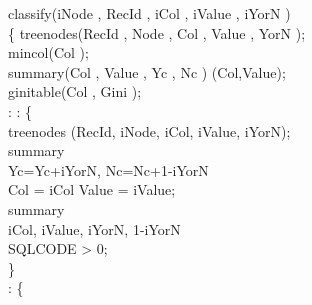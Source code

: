 {\renewcommand{\baselinestretch}{1}
\normalsize

\begin{algorithm}[!htb]
\begin{algorithmic}[1]
\STATE{} classify(iNode , RecId , iCol , \kw{}iValue , iYorN )\\
\STATE\{\hspace{.2cm} treenodes(RecId , Node , Col , \kw{}Value , YorN );\\
\STATE\hspace{.3cm} mincol(Col );\\
\STATE\hspace{.3cm} summary(Col , Value , Yc , Nc )
(Col,Value);\\
\STATE\hspace{.3cm} ginitable(Col , Gini );\\
\STATE\hspace{.3cm} :  : \{\\
\STATE\hspace{.6cm}  treenodes (RecId, iNode, iCol, iValue, iYorN);\\
\STATE\hspace{.6cm} summary\\
\hspace{.9cm} Yc=Yc+iYorN, Nc=Nc+1-iYorN\\
\hspace{.9cm} Col = iCol  Value = iValue;\\
\STATE\hspace{.6cm}  summary \\
\hspace{.9cm} iCol, iValue, iYorN, 1-iYorN \\
\hspace{.9cm} SQLCODE > 0;\\
\hspace{.3cm}\}\\
\STATE\hspace{.3cm} : \{\\

\end{algorithmic}
\end{algorithm}}
